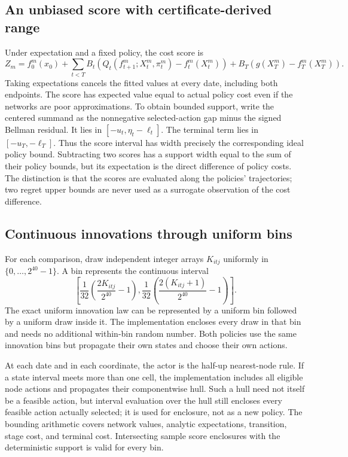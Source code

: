 \documentclass[ecta,nameyear,draft]{econsocart}
\begin{document}
\subsection{An unbiased score with certificate-derived range}
Under expectation and a fixed policy, the cost score is
\[
 Z_m=f_0^m(x_0)+\sum_{t<T}B_t(Q_t(f_{t+1}^m;X_t^m,\pi_t^m)-f_t^m(X_t^m))
            +B_T(g(X_T^m)-f_T^m(X_T^m)).
\]
Taking expectations cancels the fitted values at every date, including both endpoints. The score has expected value equal to actual policy cost even if the networks are poor approximations. To obtain bounded support, write the centered summand as the nonnegative selected-action gap minus the signed Bellman residual. It lies in $[-u_t,\eta_t-\ell_t]$. The terminal term lies in $[-u_T,-\ell_T]$. Thus the score interval has width precisely the corresponding ideal policy bound. Subtracting two scores has a support width equal to the sum of their policy bounds, but its expectation is the direct difference of policy costs. The distinction is that the scores are evaluated along the policies' trajectories; two regret upper bounds are never used as a surrogate observation of the cost difference.

\subsection{Continuous innovations through uniform bins}
For each comparison, draw independent integer arrays $K_{itj}$ uniformly in $\{0,\ldots,2^{40}-1\}$. A bin represents the continuous interval
\[
 \left[\frac1{32}\left(\frac{2K_{itj}}{2^{40}}-1\right),
       \frac1{32}\left(\frac{2(K_{itj}+1)}{2^{40}}-1\right)\right].
\]
The exact uniform innovation law can be represented by a uniform bin followed by a uniform draw inside it. The implementation encloses every draw in that bin and needs no additional within-bin random number. Both policies use the same innovation bins but propagate their own states and choose their own actions.

At each date and in each coordinate, the actor is the half-up nearest-node rule. If a state interval meets more than one cell, the implementation includes all eligible node actions and propagates their componentwise hull. Such a hull need not itself be a feasible action, but interval evaluation over the hull still encloses every feasible action actually selected; it is used for enclosure, not as a new policy. The bounding arithmetic covers network values, analytic expectations, transition, stage cost, and terminal cost. Intersecting sample score enclosures with the deterministic support is valid for every bin.
\end{document}

